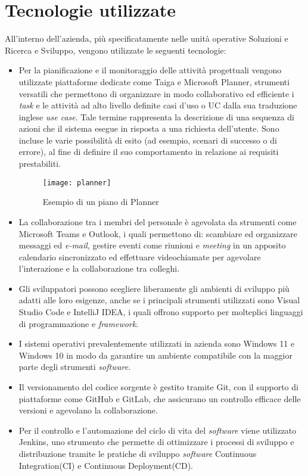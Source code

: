 \section{Tecnologie utilizzate}
All'interno dell'azienda, più specificatamente nelle unità operative Soluzioni e Ricerca e Sviluppo, vengono utilizzate le seguenti tecnologie: 
\begin{itemize}
    \item Per la pianificazione e il monitoraggio delle attività progettuali vengono utilizzate piattaforme dedicate come Taiga e Microsoft Planner, strumenti versatili che permettono di organizzare in modo collaborativo ed efficiente i \emph{task} e le attività ad alto livello definite casi d'uso o UC dalla sua traduzione inglese \emph{use case}. Tale termine rappresenta la descrizione di una sequenza di azioni che il sistema esegue in risposta a una richiesta dell'utente. Sono incluse le varie possibilità di esito (ad esempio, scenari di successo o di errore), al fine di definire il suo comportamento in relazione ai requisiti prestabiliti. 
    \begin{figure}[htbp] 
        \centering 
        \texttt{[image: planner]}
        \caption{Esempio di un piano di Planner} 
        \label{fig:planner}
    \end{figure}
    \item La collaborazione tra i membri del personale è agevolata da strumenti come Microsoft Teams e Outlook, i quali permettono di: scambiare ed organizzare messaggi ed \emph{e-mail}, gestire eventi come riunioni e \emph{meeting} in un apposito calendario sincronizzato ed effettuare videochiamate per agevolare l'interazione e la collaborazione tra colleghi. 
    \item Gli sviluppatori possono scegliere liberamente gli ambienti di sviluppo più adatti alle loro esigenze, anche se i principali strumenti utilizzati sono Visual Studio Code e IntelliJ IDEA, i quali offrono supporto per molteplici linguaggi di programmazione e \emph{framework}. 
    \item I sistemi operativi prevalentemente utilizzati in azienda sono Windows 11 e Windows 10 in modo da garantire un ambiente compatibile con la maggior parte degli strumenti \emph{software}. 
    \item Il versionamento del codice sorgente è gestito tramite Git, con il supporto di piattaforme come GitHub e GitLab, che assicurano un controllo efficace delle versioni e agevolano la collaborazione. 
    \item Per il controllo e l'automazione del ciclo di vita del \emph{software} viene utilizzato Jenkins, uno strumento che permette di ottimizzare i processi di sviluppo e distribuzione tramite le pratiche di sviluppo \emph{software} \gls{Continuous Integration}(CI) e \gls{Continuous Deployment}(CD).\\

\end{itemize}
